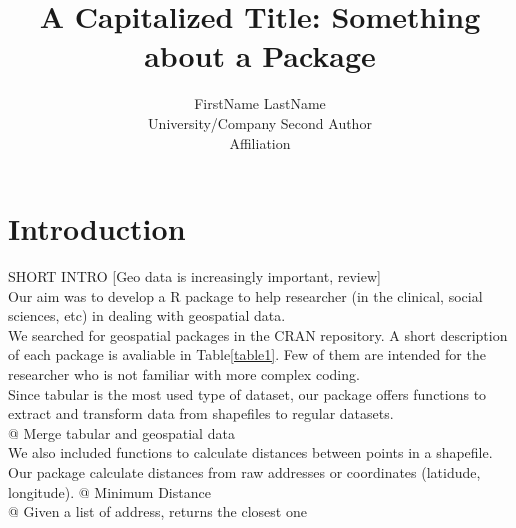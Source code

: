 \documentclass[article]{jss}
\author{
FirstName LastName\\University/Company \And Second Author\\Affiliation
}
\title{A Capitalized Title: Something about a Package \pkg{foo}}
\begin{document}
\hypertarget{introduction}{%
\section{Introduction}\label{introduction}}

SHORT INTRO {[}Geo data is increasingly important, review{]}\\
Our aim was to develop a R package to help researcher (in the clinical,
social sciences, etc) in dealing with geospatial data.\\
We searched for geospatial packages in the CRAN repository. A short
description of each package is avaliable in Table\ref{table1}. Few of
them are intended for the researcher who is not familiar with more
complex coding.\\
Since tabular is the most used type of dataset, our package offers
functions to extract and transform data from shapefiles to regular
datasets.\\
@ Merge tabular and geospatial data\\
We also included functions to calculate distances between points in a
shapefile. Our package calculate distances from raw addresses or
coordinates (latidude, longitude). @ Minimum Distance\\
@ Given a list of address, returns the closest one
\end{document}
